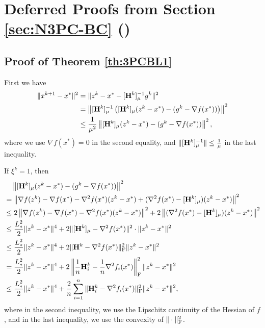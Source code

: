 \documentclass[11pt]{article}
\begin{document}
	
	\section{Deferred Proofs from Section \ref{sec:N3PC-BC} ()}
	
	
	\subsection{Proof of Theorem \ref{th:3PCBL1}}
	
	First we have 
	\begin{align}
		\|x^{k+1} - x^*\|^2 & = \|z^k - x^* - [\mathbf{H}^k]_\mu^{-1} g^k \|^2 \nonumber \\ 
		& = \left\| [\mathbf{H}^k]_\mu^{-1} \left(  [\mathbf{H}^k]_\mu (z^k - x^*) - (g^k - \nabla f(x^*))  \right)   \right\|^2 \nonumber \\ 
		& \leq \frac{1}{\mu^2} \left\|   [\mathbf{H}^k]_\mu (z^k - x^*) - (g^k - \nabla f(x^*))   \right\|^2, \label{eq:11-BL1}
	\end{align}
	where we use $\nabla f(x^*) = 0$ in the second equality, and $\|[\mathbf{H}^k]_\mu^{-1}\| \leq \frac{1}{\mu}$ in the last inequality. 
	
	If $\xi^k = 1$, then 
	\begin{align}
		& \quad \left\|   [\mathbf{H}^k]_\mu (z^k - x^*) - (g^k - \nabla f(x^*))   \right\|^2 \nonumber \\ 
		& = \left\|  \nabla f(z^k) - \nabla f(x^*) - \nabla^2 f(x^*) (z^k-x^*) + (\nabla^2 f(x^*) - [\mathbf{H}^k]_\mu) (z^k-x^*)  \right\|^2 \nonumber \\ 
		& \leq 2\left\|  \nabla f(z^k) - \nabla f(x^*) - \nabla^2 f(x^*) (z^k-x^*) \right\|^2  + 2\left\| (\nabla^2 f(x^*) - [\mathbf{H}^k]_\mu) (z^k-x^*)  \right\|^2 \nonumber \\ 
		& \leq \frac{L_{*}^2}{2} \|z^k - x^*\|^4 + 2\| [\mathbf{H}^k]_\mu - \nabla^2 f(x^*)\|^2 \cdot \|z^k-x^*\|^2 \nonumber \\ 
		& \leq \frac{L_{*}^2}{2} \|z^k - x^*\|^4 + 2\| \mathbf{H}^k - \nabla^2 f(x^*)\|_{\rm F}^2 \|z^k-x^*\|^2 \nonumber \\ 
		& = \frac{L_{*}^2}{2} \|z^k - x^*\|^4 + 2 \left\| \frac{1}{n} \mathbf{H}_i^k - \frac{1}{n} \nabla^2 f_i(x^*) \right\|^2_{\rm F} \|z^k - x^*\|^2 \nonumber \\
		& \leq \frac{L_{*}^2}{2} \|z^k - x^*\|^4 +  \frac{2}{n} \sum_{i=1}^n \| \mathbf{H}_i^k - \nabla^2 f_i(x^*) \|^2_{\rm F} \|z^k-x^*\|^2, \label{eq:22-BL1}
	\end{align}
	where in the second inequality, we use the Lipschitz continuity of the Hessian of $f$, and in the last inequality, we use the convexity of $\|\cdot\|^2_{\rm F}$. 
	
\end{document}
